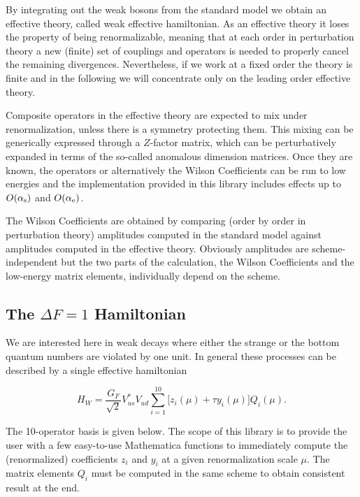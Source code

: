 \def\VmA{\mathrm{V-A}}
\def\VpA{\mathrm{V+A}}


By integrating out the weak bosons from the standard model we obtain an 
effective theory, called weak effective hamiltonian. 
As an effective theory it loses the property of being renormalizable,
meaning that at each order in perturbation theory a new (finite) set of couplings and operators
is needed to properly cancel the remaining divergences. Nevertheless, if we work at a fixed 
order the theory is finite and in the following we will concentrate only 
on the leading order effective theory.

Composite operators in the effective theory are expected to mix under renormalization, unless
there is a symmetry protecting them. This mixing can be generically expressed through a 
$Z$-factor matrix, which can be perturbatively expanded in terms of the so-called 
anomalous dimension matrices. Once they are known, the operators or alternatively the Wilson Coefficients
can be run to low energies and the implementation provided in this library includes effects
up to $O(\alpha_{\mathrm s})$ and $O(\alpha_{\mathrm e})$.

The Wilson Coefficients are obtained by comparing 
(order by order in perturbation theory) amplitudes computed in the standard model
against amplitudes computed in the effective theory. Obviously amplitudes are scheme-independent
but the two parts of the calculation, the Wilson Coefficients and the low-energy matrix elements, 
individually depend on the scheme. 

\subsection{The $\Delta F=1$ Hamiltonian}

We are interested here in weak decays where either the strange or the bottom quantum numbers 
are violated by one unit. In general these processes can be described by a single effective
hamiltonian

\begin{equation}
H_W = \frac{G_F}{\sqrt{2}}V_{us}^*V_{ud}\sum_{i=1}^{10} \bigl[z_i(\mu) + \tau y_i(\mu)\bigr] Q_i(\mu).
\label{eq:H_W}
\end{equation}

The 10-operator basis is given below. The scope of this library is to provide the user
with a few easy-to-use Mathematica functions to immediately compute the (renormalized) 
coefficients $z_i$ and $y_i$ at a given renormalization scale $\mu$. The matrix elements 
$Q_i$ must be computed in the same scheme to obtain consistent result at the end.

